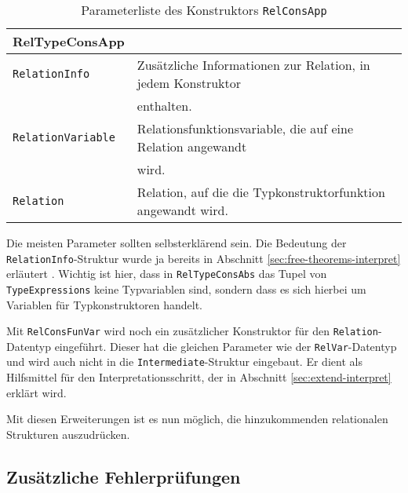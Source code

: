 \begin{table}[th]
\begin{tabular}{ | l | l | }
\hline
RelTypeConsApp & \\
\hline
\texttt{RelationInfo} & Zusätzliche Informationen zur Relation, in jedem Konstruktor \\
& enthalten. \\
\texttt{RelationVariable} & Relationsfunktionsvariable, die auf eine Relation angewandt\\
& wird. \\
\texttt{Relation} & Relation, auf die die Typkonstruktorfunktion angewandt wird. \\
\hline
\end{tabular}
\caption{Parameterliste des Konstruktors \texttt{RelConsApp}}
\label{tab:reltypeconsapp}
\end{table}

Die meisten Parameter sollten selbsterklärend sein. Die Bedeutung der \texttt{RelationInfo}-Struktur wurde ja bereits in Abschnitt \ref{sec:free-theorems-interpret} erläutert . Wichtig ist hier, dass in \texttt{RelTypeConsAbs} das
Tupel von \texttt{TypeExpressions} keine Typvariablen sind, sondern dass es sich hierbei um Variablen für Typkonstruktoren handelt.

Mit \texttt{RelConsFunVar} wird noch ein zusätzlicher Konstruktor für den \texttt{Relation}-Datentyp eingeführt. Dieser hat
die gleichen Parameter wie der \texttt{RelVar}-Datentyp und wird auch nicht in die \texttt{Intermediate}-Struktur eingebaut.
Er dient als Hilfsmittel für den Interpretationsschritt, der in Abschnitt \ref{sec:extend-interpret} erklärt wird.

Mit diesen Erweiterungen ist es nun möglich, die hinzukommenden relationalen Strukturen auszudrücken.


\subsection{Zusätzliche Fehlerprüfungen}


